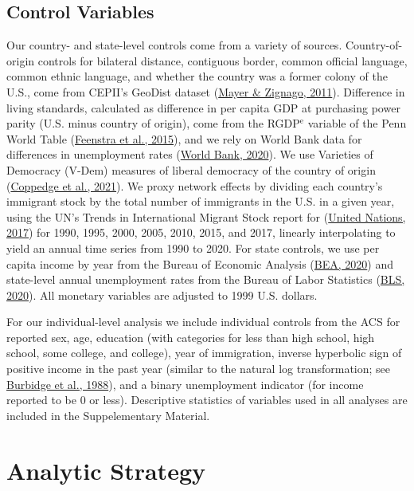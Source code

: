 \documentclass[
  11pt,
]{article}
\begin{document}
\hypertarget{control-variables}{%
\subsection{Control Variables}\label{control-variables}}

Our country- and state-level controls come from a variety of sources. Country-of-origin controls for bilateral distance, contiguous border, common official language, common ethnic language, and whether the country was a former colony of the U.S., come from CEPII's GeoDist dataset (\protect\hyperlink{ref-mayer_2011}{Mayer \& Zignago, 2011}). Difference in living standards, calculated as difference in per capita GDP at purchasing power parity (U.S. minus country of origin), come from the RGDP\(^\text{e}\) variable of the Penn World Table (\protect\hyperlink{ref-feenstra_2015}{Feenstra et al., 2015}), and we rely on World Bank data for differences in unemployment rates (\protect\hyperlink{ref-worldbank_2020}{World Bank, 2020}). We use Varieties of Democracy (V-Dem) measures of liberal democracy of the country of origin (\protect\hyperlink{ref-coppedge_2021}{Coppedge et al., 2021}). We proxy network effects by dividing each country's immigrant stock by the total number of immigrants in the U.S. in a given year, using the UN's Trends in International Migrant Stock report for (\protect\hyperlink{ref-unitednations_2017}{United Nations, 2017}) for 1990, 1995, 2000, 2005, 2010, 2015, and 2017, linearly interpolating to yield an annual time series from 1990 to 2020. For state controls, we use per capita income by year from the Bureau of Economic Analysis (\protect\hyperlink{ref-bea_2020}{BEA, 2020}) and state-level annual unemployment rates from the Bureau of Labor Statistics (\protect\hyperlink{ref-bls_2020}{BLS, 2020}). All monetary variables are adjusted to 1999 U.S. dollars.

For our individual-level analysis we include individual controls from the ACS for reported sex, age, education (with categories for less than high school, high school, some college, and college), year of immigration, inverse hyperbolic sign of positive income in the past year (similar to the natural log transformation; see \protect\hyperlink{ref-burbidge_1988_alternative}{Burbidge et al., 1988}), and a binary unemployment indicator (for income reported to be 0 or less). Descriptive statistics of variables used in all analyses are included in the Suppelementary Material.

\hypertarget{analytic-strategy}{%
\section{Analytic Strategy}\label{analytic-strategy}}
\end{document}
